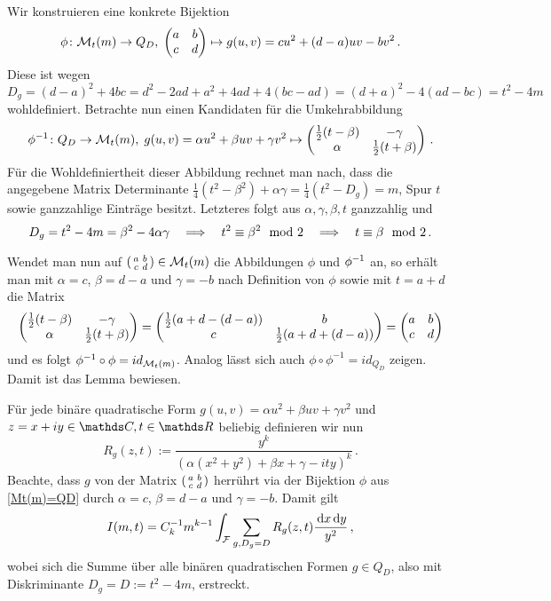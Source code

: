 \begin{bewe}
\begin{bewe}
Wir konstruieren eine konkrete Bijektion
\[
	\phi \colon \M_t (m) \to Q_D, \; \abcd \mapsto g(u, v) = cu^2 + (d-a)uv - bv^2
	\,.
\]
Diese ist wegen 
\[
	D_g = (d-a)^2 + 4bc = d^2 - 2ad + a^2 + 4ad + 4 (bc-ad) = (d+a)^2 - 4(ad-bc) = t^2 - 4m
\]
wohldefiniert. Betrachte nun einen Kandidaten für die Umkehrabbildung
\[
	\phi^{-1} \colon Q_D \to \M_t (m), \; g(u, v) = \alpha u^2 + \beta uv + \gamma v^2 \mapsto \mymat* {\frac 12 (t - \beta)} {-\gamma} \alpha {\frac 12(t + \beta)}
	\,.
\]
Für die Wohldefiniertheit dieser Abbildung rechnet man nach, dass die angegebene Matrix Determinante $\frac 14 (t^2 - \beta^2) + \alpha \gamma = \frac 14 (t^2 - D_g) = m$, Spur $t$ sowie ganzzahlige Einträge besitzt. Letzteres folgt aus $\alpha, \gamma, \beta, t$ ganzzahlig und
\[
	D_g = t^2 - 4m = \beta^2 - 4\alpha \gamma \quad \Longrightarrow \quad t^2 \equiv \beta^2 \mod 2 \quad \Longrightarrow \quad t \equiv \beta \mod 2
	\,.
\]

Wendet man nun auf $\abcd \in \M_t(m)$ die Abbildungen $\phi$ und $\phi^{-1}$ an, so erhält man mit $\alpha = c$, $\beta = d - a$ und $\gamma = -b$ nach Definition von $\phi$ sowie mit $t = a+d$ die Matrix
\[
	\mymat* {\frac 12 (t - \beta)} {-\gamma} \alpha {\frac 12(t + \beta)} = \mymat* {\frac 12 (a + d - (d-a))}bc{\frac 12(a + d + (d-a))} = \mymat* abcd
\]
und es folgt $\phi^{-1} \circ \phi = id_{\mathcal{M}_t(m)}$. Analog lässt sich auch $\phi \circ \phi^{-1} = id_{Q_D}$ zeigen. Damit ist das Lemma bewiesen.
\end{bewe}

Für jede binäre quadratische Form $g(u, v) = \alpha u^2 + \beta uv + \gamma v^2$ und $z = x + iy \in \CC, t \in \RR$ beliebig definieren wir nun
\[
	R_g(z,t) := \frac {y^k} {\left( \alpha(x^2 + y^2) + \beta x + \gamma - ity \right)^k}
	\,.
\]
Beachte, dass $g$ von der Matrix $\abcd$ herrührt via der Bijektion $\phi$ aus \autoref{Mt(m)=QD} durch $\alpha = c$, $\beta = d - a$ und $\gamma = -b$. Damit gilt
\[
	I(m, t) = C_k^{-1} m^{k-1} \int_{\mathcal{F}} \sum_{g, D_g = D} R_g(z,t) \frac {\,\mathrm{d} x \,\mathrm{d} y}{y^2}
	\,,
\]
wobei sich die Summe über alle binären quadratischen Formen $g \in Q_D$, also mit Diskriminante $D_g = D := t^2 - 4m$, erstreckt.


\end{bewe}
